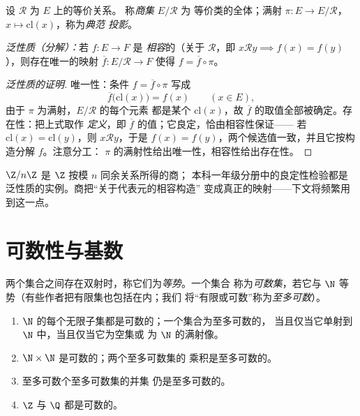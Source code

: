\begin{definition}[商集]\label{def:b2:structures:quotient}
设 $\mathcal{R}$ 为 $E$ 上的等价关系。
称\emph{商集} $E/\mathcal{R}$ 为
等价类的全体；满射 $\pi \colon E \to E/\mathcal{R}$，
$x \mapsto \mathrm{cl}(x)$，称为\emph{典范
投影}。

\emph{泛性质（分解）：}若 $f \colon E \to F$ 是
\emph{相容}的（关于 $\mathcal{R}$，即 $x \mathbin{\mathcal{R}}
y \implies f(x) = f(y)$），则存在唯一的映射 $\overline f
\colon E/\mathcal{R} \to F$ 使得 $f = \overline f \circ \pi$。
\end{definition}

\begin{proof}[泛性质的证明]
唯一性：条件 $f = \overline f \circ \pi$ 写成
\[
\overline f\bigl(\mathrm{cl}(x)\bigr) = f(x)
\qquad (x \in E),
\]
由于 $\pi$ 为满射，$E/\mathcal{R}$ 的每个元素
都是某个 $\mathrm{cl}(x)$，故
$\overline f$ 的取值全部被确定。存在性：把上式取作
\emph{定义}，即 $\overline f$ 的值；它良定，恰由相容性保证——
若 $\mathrm{cl}(x) =
\mathrm{cl}(y)$，则 $x \mathbin{\mathcal{R}} y$，于是 $f(x) =
f(y)$，两个候选值一致，并且它按构造分解
$f$。注意分工：
$\pi$ 的满射性给出唯一性，相容性给出存在性。
\end{proof}

\begin{example}
$\Z/n\Z$ 是 $\Z$ 按模 $n$ 同余关系所得的商；
本科一年级分册中的良定性检验都是
泛性质的实例。商把“关于代表元的相容构造”
变成真正的映射——下文将频繁用到这一点。
\end{example}

\section{可数性与基数}

\begin{definition}[等势与可数性]\label{def:b2:structures:countable}
两个集合之间存在双射时，称它们为\emph{等势}。一个集合
称为\emph{可数集}，若它与
$\N$ 等势（有些作者把有限集也包括在内；我们
将“有限或可数”称为\emph{至多可数}）。
\end{definition}

\begin{proposition}[稳定性质]\label{prop:b2:structures:countablestable}
\begin{enumerate}
  \item $\N$ 的每个无限子集都是可数的；一个集合为至多可数的，
        当且仅当它单射到 $\N$ 中，当且仅当它为空集或
        为 $\N$ 的满射像。
  \item $\N \times \N$ 是可数的；两个至多可数集的
        乘积是至多可数的。
  \item 至多可数个至多可数集的并集
        仍是至多可数的。
  \item $\Z$ 与 $\Q$ 都是可数的。
\end{enumerate}
\end{proposition}

